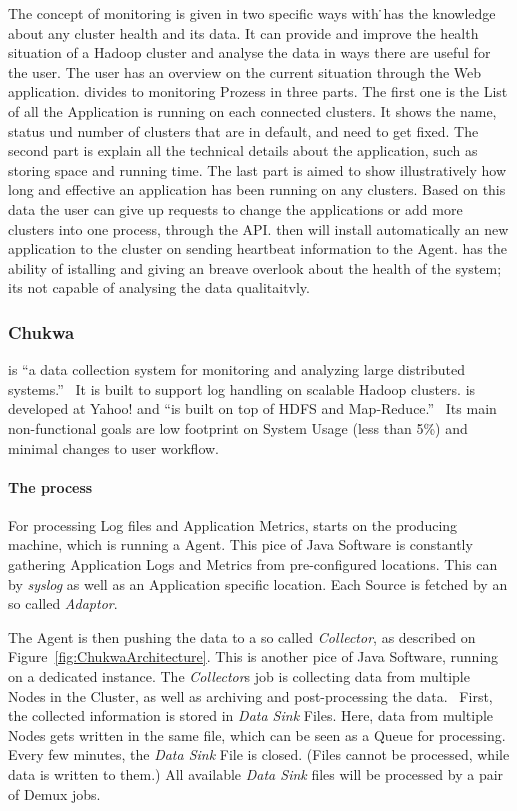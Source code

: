 The concept of monitoring is given in two specific ways with \amb\. \amb has the knowledge about any cluster health and its data. It can provide and improve the health situation of a Hadoop cluster and analyse the data in ways there are useful for the user. The user has an overview on the current situation through the Web application. \amb divides to monitoring Prozess in three parts. The first one is the List of all the Application \amb is running on each connected clusters. It shows the name, status und number of clusters that are in default, and need to get fixed. The second part is explain all the technical details about the application, such as storing space and running time. The last part is aimed to show illustratively how long and effective an application has been running on any clusters. Based on this data the user can give up requests to change the applications or add more clusters into one process, through the API. \amb then will install automatically an new application to the cluster on sending heartbeat information to the \amb Agent. \amb has the ability of istalling and giving an breave overlook about the health of the system; its not capable of analysing the data qualitaitvly.

\subsubsection{Chukwa}
\chuklong is ``a data collection system for monitoring and analyzing large distributed systems.''~\cite{Boulona}
It is built to support log handling on scalable Hadoop clusters. \chuk is developed at Yahoo! and ``is built on top of HDFS and Map-Reduce.''~\cite{Rabkin2008a}
Its main non-functional goals are low footprint on System Usage (less than 5\%) and minimal changes to user workflow.~\cite{Rabkin2010}

\paragraph{The process}
For processing Log files and Application Metrics, \chuk starts on the producing machine, which is running a \chuk Agent. 
This pice of Java Software is constantly gathering Application Logs and Metrics from pre-configured locations. 
This can by \textit{syslog} as well as an Application specific location. 
Each Source is fetched by an so called \textit{Adaptor}.~\cite{ChukwaAdminAgent}

The Agent is then pushing the data to a so called \textit{Collector}, as described on Figure~\ref{fig:ChukwaArchitecture}.
This is another pice of Java Software, running on a dedicated \chuk instance. 
The \textit{Collector}s job is collecting data from multiple Nodes in the Cluster, as well as archiving and post-processing the data.~\cite{Jose2014}
First, the collected information is stored in \textit{Data Sink} Files. 
Here, data from multiple Nodes gets written in the same file, which can be seen as a Queue for processing.
Every few minutes, the \textit{Data Sink} File is closed. (Files cannot be processed, while data is written to them.)
All available \textit{Data Sink} files will be processed by a pair of Demux \mr jobs.~\cite{Boulona} 

